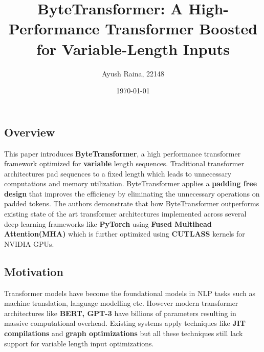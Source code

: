 \documentclass{article}
\title{ByteTransformer: A High-Performance Transformer
Boosted for Variable-Length Inputs}
\author{Ayush Raina, 22148}
\date{\today}
\begin{document}
 

\maketitle

\subsection*{Overview}
This paper introduces \textbf{ByteTransformer}, a high performance transformer framework optimized for \textbf{variable} length sequences. Traditional transformer architectures pad sequences to a fixed length which leads to unnecessary computations and memory utilization. ByteTransformer applies a \textbf{padding free design} that improves the efficiency by eliminating the unnecessary operations on padded tokens. The authors demonstrate that how ByteTransformer outperforms existing state of the art transformer architectures implemented across several deep learning frameworks like \textbf{PyTorch} using \textbf{Fused Multihead Attention(MHA)} which is further optimized using \textbf{CUTLASS} kernels for NVIDIA GPUs. 

\subsection*{Motivation}
Transformer models have become the foundational models in NLP tasks such as 
machine translation, language modelling etc. However modern transformer architectures like \textbf{BERT, GPT-3} have billions of parameters resulting in massive computational overhead. Existing systems apply techniques like \textbf{JIT compilations} and \textbf{graph optimizations} but all these techniques still lack support for variable length input optimizations.
\end{document}
